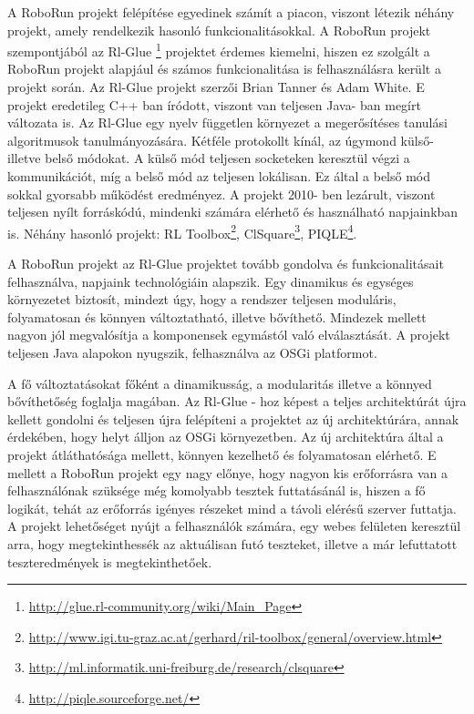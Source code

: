 	A RoboRun projekt felépítése egyedinek számít a piacon, viszont létezik néhány projekt, amely rendelkezik hasonló funkcionalitásokkal. A RoboRun projekt szempontjából az Rl-Glue \footnote{\href {http://glue.rl-community.org/wiki/Main\_Page}{http://glue.rl-community.org/wiki/Main\_Page}} projektet érdemes kiemelni, hiszen ez szolgált a RoboRun projekt alapjául és számos funkcionalitása is felhasználásra került a projekt során. Az Rl-Glue\cite{rlglue} projekt szerzői Brian Tanner és Adam White. E projekt eredetileg C++ ban íródott, viszont van teljesen Java- ban megírt változata is. Az Rl-Glue egy nyelv független környezet a megerősítéses tanulási algoritmusok tanulmányozására. Kétféle protokollt kínál, az úgymond külső- illetve belső módokat. A külső mód teljesen socketeken keresztül végzi a kommunikációt, míg a belső mód az teljesen lokálisan. Ez által a belső mód sokkal gyorsabb működést eredményez. A projekt 2010- ben lezárult, viszont teljesen nyílt forráskódú, mindenki számára elérhető és használható napjainkban is. Néhány hasonló projekt: RL Toolbox\footnote{\href {http://www.igi.tu-graz.ac.at/gerhard/ril-toolbox/general/overview.html}{http://www.igi.tu-graz.ac.at/gerhard/ril-toolbox/general/overview.html}}, ClSquare\footnote{\href {http://ml.informatik.uni-freiburg.de/research/clsquare}{http://ml.informatik.uni-freiburg.de/research/clsquare}}, PIQLE\footnote{\href{http://piqle.sourceforge.net/}{http://piqle.sourceforge.net/}}. 


	A RoboRun projekt az Rl-Glue projektet tovább gondolva és funkcionalitásait felhasználva, napjaink technológiáin alapszik. Egy dinamikus és egységes környezetet biztosít, mindezt úgy, hogy a rendszer teljesen moduláris, folyamatosan és könnyen változtatható, illetve bővíthető. Mindezek mellett nagyon jól megvalósítja a komponensek egymástól való elválasztását. A projekt teljesen Java alapokon nyugszik, felhasználva az OSGi platformot. 
	
	A fő változtatásokat főként a dinamikusság, a modularitás illetve a könnyed bővíthetőség foglalja magában. Az Rl-Glue - hoz képest a teljes architektúrát újra kellett gondolni és teljesen újra felépíteni a projektet az új architektúrára, annak érdekében, hogy helyt álljon az OSGi környezetben. Az új architektúra által a projekt átláthatósága mellett, könnyen kezelhető és folyamatosan elérhető. E mellett a RoboRun projekt egy nagy előnye, hogy nagyon kis erőforrásra van a felhasználónak szüksége még komolyabb tesztek futtatásánál is, hiszen a fő logikát, tehát az erőforrás igényes részeket mind a távoli elérésű szerver futtatja. A projekt lehetőséget nyújt a felhasználók számára, egy webes felületen keresztül arra, hogy megtekinthessék az aktuálisan futó teszteket, illetve a már lefuttatott teszteredmények is megtekinthetőek.	
	
